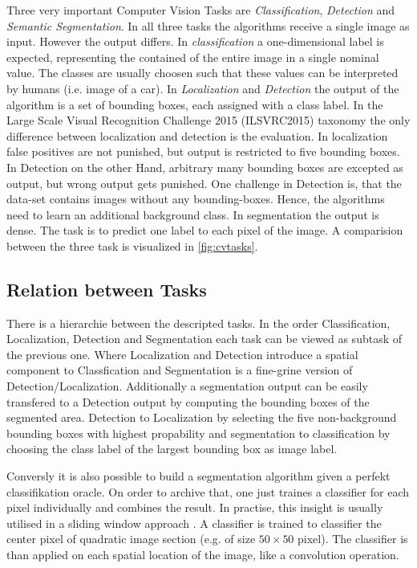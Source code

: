 Three very important Computer Vision Tasks are \emph{Classification}, \emph{Detection} and \emph{Semantic Segmentation}. In all three tasks the algorithms receive a single image as input. However the output differs. In \emph{classification} a one-dimensional label is expected, representing the contained of the entire image in a single nominal value. The classes are usually choosen such that these values can be interpreted by humans (i.e. image of a car). In \emph{Localization} and \emph{Detection} the output of the algorithm is a set of bounding boxes, each assigned with a class label. 
In the Large Scale Visual Recognition Challenge 2015 (ILSVRC2015) taxonomy the only difference between localization and detection is the evaluation. In localization false positives are not punished, but output is restricted to five bounding boxes. In Detection on the other Hand, arbitrary many bounding boxes are excepted as output, but wrong output gets punished. One challenge in Detection is, that the data-set contains images without any bounding-boxes. Hence, the algorithms need to learn an additional background class.
In segmentation the output is dense. The task is to predict one label to each pixel of the image. 
A comparision between the three task is visualized in \cref{fig:cvtasks}.


\subsection{Relation between Tasks} \label{sec:relation}

There is a hierarchie between the descripted tasks. In the order Classification, Localization, Detection and Segmentation each task can be viewed as subtask of the previous one. Where Localization and Detection introduce a spatial component to Classfication and Segmentation is a fine-grine version of Detection/Localization. Additionally a segmentation output can be easily transfered to a Detection output by computing the bounding boxes of the segmented area. Detection to Localization by selecting the five non-background bounding boxes with highest propability and segmentation to classification by choosing the class label of the largest bounding box as image label.

Conversly it is also possible to build a segmentation algorithm given a perfekt classifikation oracle. On order to archive that, one just traines a classifier for each pixel individually and combines the result. In practise, this insight is usually utilised in a sliding window approach \cite{highly,bktt}. A classifier is trained to classifier the center pixel of quadratic image section (e.g. of size $50 \times 50$ pixel). The classifier is than applied on each spatial location of the image, like a convolution operation.   


